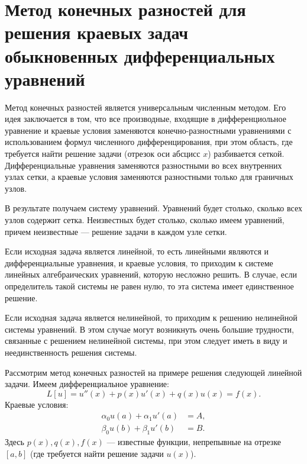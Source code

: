 


%

\setcounter{page}{2}

\section*{Метод конечных разностей для решения краевых задач обыкновенных дифференциальных уравнений}
Метод конечных разностей является универсальным численным методом. Его идея заключается в том, что все производные, входящие в дифференциольное уравнение и краевые условия заменяются конечно-разностными уравнениями с использованием формул численного дифференцирования, при этом область, где требуется найти решение задачи (отрезок оси абсцисс $x$) разбивается сеткой. Дифференциальные уравнения заменяются разностными во всех внутренних узлах сетки, а краевые условия заменяются разностными только для граничных узлов. 

В результате получаем систему уравнений. Уравнений будет столько, сколько всех узлов содержит сетка. Неизвестных будет столько, сколько имеем уравнений, причем неизвестные --- решение задачи в каждом узле сетки.

Если исходная задача является линейной, то есть линейными являются и дифференциальные уравнения, и краевые условия, то приходим к системе линейных алгебраических уравнений, которую несложно решить. В случае, если определитель такой системы не равен нулю, то эта система имеет единственное решение.

Если исходная задача является нелинейной, то приходим к решению нелинейной системы уравнений. В этом случае могут возникнуть очень большие трудности, связанные с решением нелинейной системы, при этом следует иметь в виду и неединственность решения системы. 

Рассмотрим метод конечных разностей на примере решения следующей линейной задачи.
Имеем дифференциальное уравнение:
\begin{equation}\label{eq_1} 
L[u] = u''(x)+p(x)u'(x)+q(x)u(x) = f(x).
\end{equation}
Краевые условия:
\begin{equation}\label{eq_2} 
\begin{split}
\alpha_0u(a)+\alpha_1u'(a) &= A,\\
\beta_0u(b)+\beta_1u'(b) &= B.
\end{split}
\end{equation}
Здесь $p(x), q(x), f(x)$ --- известные функции, непрепывные на отрезке $[a,b]$ (где требуется найти решение задачи $u(x)$).

